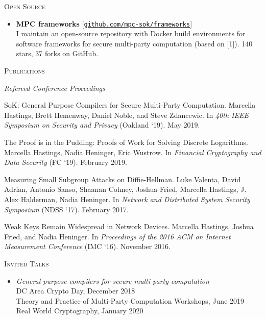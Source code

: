 \documentclass{article}
\begin{document}
\textsc{Open Source} \hrulefill
\begin{itemize}[label={}]
  \item \textbf{MPC frameworks} [\href{https://github.com/mpc-sok/frameworks}{\texttt{github.com/mpc-sok/frameworks}}]\\
  I maintain an open-source repository with Docker build environments for software frameworks for secure multi-party computation (based on [1]). 140 stars, 37 forks on GitHub. 
\end{itemize}

\textsc{Publications} \hrulefill

\textit{Refereed Conference Proceedings}
\begin{enumerate}[label={[\arabic*]}]
\item SoK: General Purpose Compilers for Secure Multi-Party Computation. 
Marcella Hastings, Brett Hemenway, Daniel Noble, and Steve Zdancewic.
In \textit{40th IEEE Symposium on Security and Privacy} (Oakland `19). May 2019.
\item The Proof is in the Pudding: Proofs of Work for Solving Discrete Logarithms.
Marcella Hastings, Nadia Heninger, Eric Wustrow.
In \emph{Financial Cryptography and Data Security} (FC `19). February 2019.
\item Measuring Small Subgroup Attacks on Diffie-Hellman. 
Luke Valenta, David Adrian, Antonio Sanso, Shaanan Cohney, Joshua Fried, Marcella Hastings, J. Alex Halderman, Nadia Heninger. 
In \textit{Network and Distributed System Security Symposium} (NDSS `17). February 2017.
\item Weak Keys Remain Widespread in Network Devices. 
Marcella Hastings, Joshua Fried, and Nadia Heninger. 
In \textit{Proceedings of the 2016 ACM on Internet Measurement Conference} (IMC `16). November 2016.
\end{enumerate}

\textsc{Invited Talks} \hrulefill
\begin{itemize}[label={}]
\item \emph{General purpose compilers for secure multi-party computation}\\
  DC Area Crypto Day, December 2018 \\
  Theory and Practice of Multi-Party Computation Workshops, June 2019\\
  Real World Cryptography, January 2020
\end{itemize}



\end{document}
